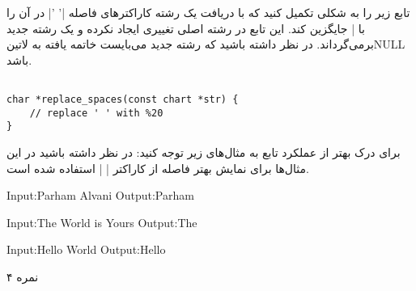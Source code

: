 \documentclass[../main.tex]{subfiles}
\begin{document}
تابع زیر را به شکلی تکمیل کنید که با دریافت یک رشته کاراکترهای فاصله |' '| در آن را با |%
جایگزین کند. این تابع در رشته اصلی تغییری ایجاد نکرده و یک رشته جدید برمی‌گرداند. در نظر داشته باشید که رشته جدید می‌بایست خاتمه یافته به ‌لاتین{NULL} باشد.

\begin{latin}
\begin{verbatim}

char *replace_spaces(const chart *str) {
    // replace ' ' with %20
}

\end{verbatim}
\end{latin}

برای درک بهتر از عملکرد تابع به مثال‌های زیر توجه کنید:
در نظر داشته باشید در این مثال‌ها برای نمایش بهتر فاصله از کاراکتر | | استفاده شده است.

\begin{latin}
\begin{verbatim*}
Input:Parham Alvani
Output:Parham%20Alvani
\end{verbatim*}

\begin{verbatim*}
Input:The World is Yours
Output:The%20World%20is%20Yours
\end{verbatim*}

\begin{verbatim*}
Input:Hello   World
Output:Hello%20%20%20World
\end{verbatim*}
\end{latin}

۴ نمره
\end{document}
